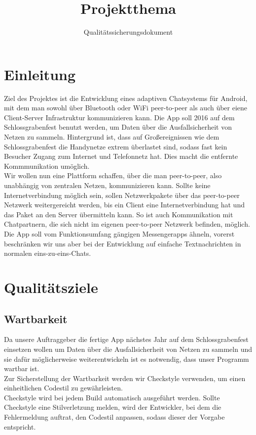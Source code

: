 \documentclass[accentcolor=tud0b,12pt,paper=a4]{tudreport}
\title{Projektthema}
\subtitle{Qualitätssicherungsdokument}
\begin{document}
	\maketitle
	\tableofcontents 
	
	\chapter{Einleitung}
        Ziel des Projektes ist die Entwicklung eines adaptiven Chatsystems für Android, mit dem man sowohl über Bluetooth oder WiFi peer-to-peer als auch über eiene Client-Server Infrastruktur kommunizieren kann. Die App soll 2016 auf dem Schlossgrabenfest benutzt werden, um Daten über die Ausfallsicherheit von Netzen zu sammeln. Hintergrund ist, dass auf Großereignissen wie dem Schlossgrabenfest die Handynetze extrem überlastet sind, sodass fast kein Besucher Zugang zum Internet und Telefonnetz hat. Dies macht die entfernte Kommmunikation umöglich.\\

        Wir wollen nun eine Plattform schaffen, über die man peer-to-peer, also unabhängig von zentralen Netzen, kommunizieren kann. Sollte keine Internetverbindung möglich sein, sollen Netzwerkpakete über das peer-to-peer Netzwerk weitergereicht werden, bis ein Client eine Internetverbindung hat und das Paket an den Server übermitteln kann. So ist auch Kommunikation mit Chatpartnern, die sich nicht im eigenen peer-to-peer Netzwerk befinden, möglich. Die App soll vom Funktionsumfang gängigen Messengerapps ähneln, vorerst beschränken wir uns aber bei der Entwicklung auf einfache Textnachrichten in normalen eins-zu-eins-Chats.
	
	\chapter{Qualitätsziele}
        \section{Wartbarkeit}
    
		Da unsere Auftraggeber die fertige App nächstes Jahr auf dem Schlossgrabenfest einsetzen wollen um Daten über die Ausfallsicherheit von Netzen zu sammeln und sie dafür möglicherweise weiterentwickeln ist es notwendig, dass unser Programm wartbar ist.\\

		Zur Sicherstellung der Wartbarkeit werden wir Checkstyle verwenden, um einen einheitlichen Codestil zu gewährleisten.\\
                Checkstyle wird bei jedem Build automatisch ausgeführt werden. Sollte Checkstyle eine Stilverletzung melden, wird der Entwickler, bei dem die Fehlermeldung auftrat, den Codestil anpassen, sodass dieser der Vorgabe entspricht.\\
\end{document}
